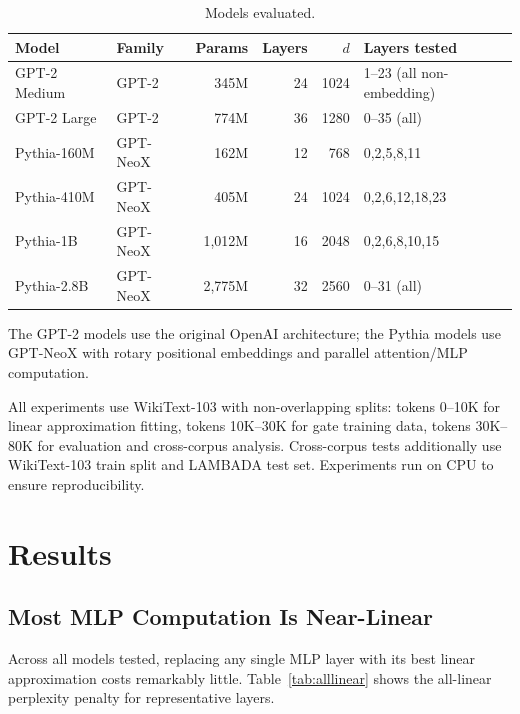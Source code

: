\documentclass[11pt]{article}
\begin{document}
\begin{table}[t]
\centering
\caption{Models evaluated.}
\label{tab:models}
\begin{tabular}{llrrrl}
\toprule
Model & Family & Params & Layers & $d$ & Layers tested \\
\midrule
GPT-2 Medium & GPT-2 & 345M & 24 & 1024 & 1--23 (all non-embedding) \\
GPT-2 Large & GPT-2 & 774M & 36 & 1280 & 0--35 (all) \\
Pythia-160M & GPT-NeoX & 162M & 12 & 768 & 0,2,5,8,11 \\
Pythia-410M & GPT-NeoX & 405M & 24 & 1024 & 0,2,6,12,18,23 \\
Pythia-1B & GPT-NeoX & 1,012M & 16 & 2048 & 0,2,6,8,10,15 \\
Pythia-2.8B & GPT-NeoX & 2,775M & 32 & 2560 & 0--31 (all) \\
\bottomrule
\end{tabular}
\end{table}

The GPT-2 models use the original OpenAI architecture; the Pythia models \citep{biderman2023} use GPT-NeoX with rotary positional embeddings and parallel attention/MLP computation.

All experiments use WikiText-103 \citep{merity2017} with non-overlapping splits: tokens 0--10K for linear approximation fitting, tokens 10K--30K for gate training data, tokens 30K--80K for evaluation and cross-corpus analysis. Cross-corpus tests additionally use WikiText-103 train split and LAMBADA test set. Experiments run on CPU to ensure reproducibility.

\section{Results}

\subsection{Most MLP Computation Is Near-Linear}

Across all models tested, replacing any single MLP layer with its best linear approximation costs remarkably little. Table~\ref{tab:alllinear} shows the all-linear perplexity penalty for representative layers.
\end{document}
